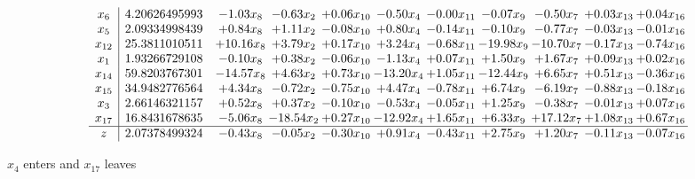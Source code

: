 \documentclass[9pt]{article}
\begin{document}
 \[\begin{array}{c| c c@{\hskip 2pt} c@{\hskip 2pt} c@{\hskip 2pt} c@{\hskip 2pt} c@{\hskip 2pt} c@{\hskip 2pt} c@{\hskip 2pt} c@{\hskip 2pt} c@{\hskip 2pt} }
 x_{6}   &  4.20626495993 & -1.03 x_{8} & -0.63 x_{2} & +  0.06 x_{10} & -0.50 x_{4} & -0.00 x_{11} & -0.07 x_{9} & -0.50 x_{7} & +  0.03 x_{13} & +  0.04 x_{16}\\
 x_{5}   &  2.09334998439 & +  0.84 x_{8} & +  1.11 x_{2} & -0.08 x_{10} & +  0.80 x_{4} & -0.14 x_{11} & -0.10 x_{9} & -0.77 x_{7} & -0.03 x_{13} & -0.01 x_{16}\\
 x_{12}   &  25.3811010511 & + 10.16 x_{8} & +  3.79 x_{2} & +  0.17 x_{10} & +  3.24 x_{4} & -0.68 x_{11} & -19.98 x_{9} & -10.70 x_{7} & -0.17 x_{13} & -0.74 x_{16}\\
 x_{1}   &  1.93266729108 & -0.10 x_{8} & +  0.38 x_{2} & -0.06 x_{10} & -1.13 x_{4} & +  0.07 x_{11} & +  1.50 x_{9} & +  1.67 x_{7} & +  0.09 x_{13} & +  0.02 x_{16}\\
 x_{14}   &  59.8203767301 & -14.57 x_{8} & +  4.63 x_{2} & +  0.73 x_{10} & -13.20 x_{4} & +  1.05 x_{11} & -12.44 x_{9} & +  6.65 x_{7} & +  0.51 x_{13} & -0.36 x_{16}\\
 x_{15}   &  34.9482776564 & +  4.34 x_{8} & -0.72 x_{2} & -0.75 x_{10} & +  4.47 x_{4} & -0.78 x_{11} & +  6.74 x_{9} & -6.19 x_{7} & -0.88 x_{13} & -0.18 x_{16}\\
 x_{3}   &  2.66146321157 & +  0.52 x_{8} & +  0.37 x_{2} & -0.10 x_{10} & -0.53 x_{4} & -0.05 x_{11} & +  1.25 x_{9} & -0.38 x_{7} & -0.01 x_{13} & +  0.07 x_{16}\\
 x_{17}   &  16.8431678635 & -5.06 x_{8} & -18.54 x_{2} & +  0.27 x_{10} & -12.92 x_{4} & +  1.65 x_{11} & +  6.33 x_{9} & + 17.12 x_{7} & +  1.08 x_{13} & +  0.67 x_{16}\\
\hline
z    &  2.07378499324 & -0.43 x_{8} & -0.05 x_{2} & -0.30 x_{10} & +  0.91 x_{4} & -0.43 x_{11} & +  2.75 x_{9} & +  1.20 x_{7} & -0.11 x_{13} & -0.07 x_{16}\\
\end{array}\]


 $ x_{4} $ enters and $ x_{17} $ leaves 
\end{document}
